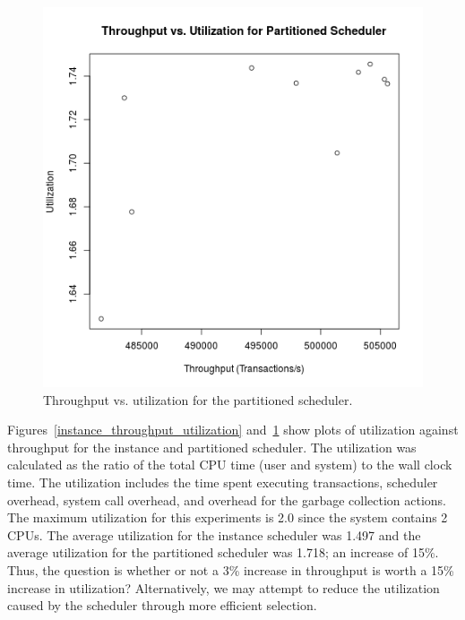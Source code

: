 \begin{figure}
\center
\includegraphics[width=\textwidth]{partitioned_throughput_utilization.png}
\caption{Throughput vs. utilization for the partitioned scheduler. \label{partitioned_throughput_utilization}}
\end{figure}

Figures~\ref{instance_throughput_utilization} and~\ref{partitioned_throughput_utilization} show plots of utilization against throughput for the instance and partitioned scheduler.
The utilization was calculated as the ratio of the total CPU time (user and system) to the wall clock time.
The utilization includes the time spent executing transactions, scheduler overhead, system call overhead, and overhead for the garbage collection actions.
The maximum utilization for this experiments is 2.0 since the system contains 2 CPUs.
The average utilization for the instance scheduler was 1.497 and the average utilization for the partitioned scheduler was 1.718; an increase of 15\%.
Thus, the question is whether or not a 3\% increase in throughput is worth a 15\% increase in utilization?
Alternatively, we may attempt to reduce the utilization caused by the scheduler through more efficient selection.

